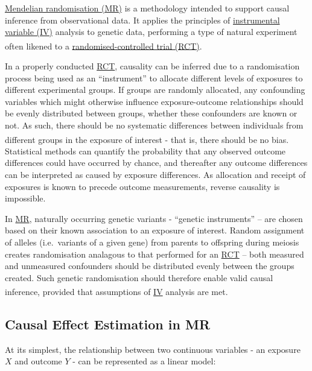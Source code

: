 \documentclass[
]{article}
\begin{document}
\hyperref[acronyms_MR]{Mendelian randomisation (MR)} is a methodology intended to support causal inference from observational data. It applies the principles of \hyperref[acronyms_IV]{instrumental variable (IV)} analysis to genetic data, performing a type of natural experiment often likened to a \hyperref[acronyms_RCT]{randomised-controlled trial (RCT)}\textsuperscript{}.

In a properly conducted \hyperref[acronyms_RCT]{RCT}, causality can be inferred due to a randomisation process being used as an ``instrument'' to allocate different levels of exposures to different experimental groups. If groups are randomly allocated, any confounding variables which might otherwise influence exposure-outcome relationships should be evenly distributed between groups, whether these confounders are known or not. As such, there should be no systematic differences between individuals from different groups in the exposure of interest - that is, there should be no bias\textsuperscript{}. Statistical methods can quantify the probability that any observed outcome differences could have occurred by chance, and thereafter any outcome differences can be interpreted as caused by exposure differences. As allocation and receipt of exposures is known to precede outcome measurements, reverse causality is impossible.

In \hyperref[acronyms_MR]{MR}, naturally occurring genetic variants - ``genetic instruments'' -- are chosen based on their known association to an exposure of interest. Random assignment of alleles (i.e.~variants of a given gene) from parents to offspring during meiosis creates randomisation analagous to that performed for an \hyperref[acronyms_RCT]{RCT} -- both measured and unmeasured confounders should be distributed evenly between the groups created. Such genetic randomisation should therefore enable valid causal inference, provided that assumptions of \hyperref[acronyms_IV]{IV} analysis are met\textsuperscript{}.

\subsection{Causal Effect Estimation in MR}\label{causal-effect-estimation-in-mr}

At its simplest, the relationship between two continuous variables - an exposure \(X\) and outcome \(Y\) - can be represented as a linear model:
\end{document}
